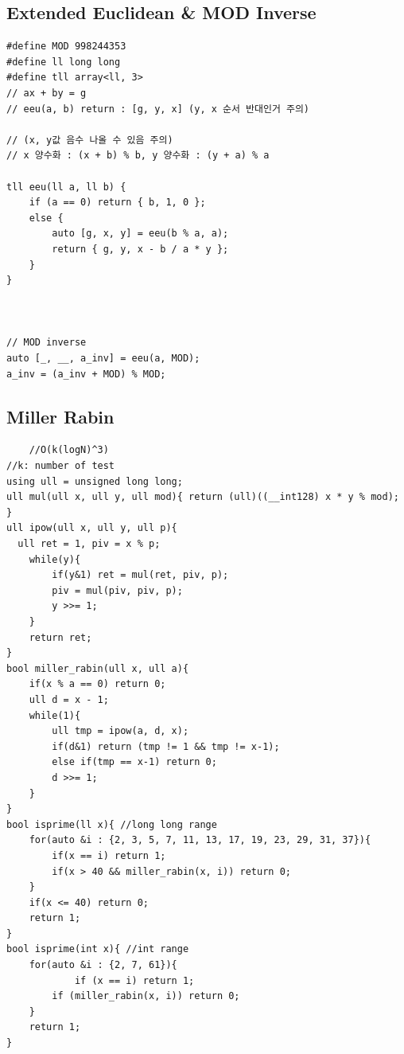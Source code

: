 \documentclass[landscape, 8pt, a4paper, oneside, twocolumn]{extarticle}
\begin{document}
\subsection{Extended Euclidean \& MOD Inverse}
\begin{verbatim}
#define MOD 998244353
#define ll long long
#define tll array<ll, 3>
// ax + by = g
// eeu(a, b) return : [g, y, x] (y, x 순서 반대인거 주의)

// (x, y값 음수 나올 수 있음 주의)
// x 양수화 : (x + b) % b, y 양수화 : (y + a) % a

tll eeu(ll a, ll b) { 
    if (a == 0) return { b, 1, 0 };
    else {
        auto [g, x, y] = eeu(b % a, a);
        return { g, y, x - b / a * y };
    }
}



// MOD inverse 
auto [_, __, a_inv] = eeu(a, MOD);
a_inv = (a_inv + MOD) % MOD;
\end{verbatim}
\subsection{Miller Rabin}
\begin{verbatim}
    //O(k(logN)^3)
//k: number of test
using ull = unsigned long long;
ull mul(ull x, ull y, ull mod){ return (ull)((__int128) x * y % mod); }
ull ipow(ull x, ull y, ull p){
  ull ret = 1, piv = x % p;
    while(y){
        if(y&1) ret = mul(ret, piv, p);
        piv = mul(piv, piv, p);
        y >>= 1;
    }
    return ret;
}
bool miller_rabin(ull x, ull a){
    if(x % a == 0) return 0;
    ull d = x - 1;
    while(1){
        ull tmp = ipow(a, d, x);
        if(d&1) return (tmp != 1 && tmp != x-1);
        else if(tmp == x-1) return 0;
        d >>= 1;
    }
}
bool isprime(ll x){ //long long range
    for(auto &i : {2, 3, 5, 7, 11, 13, 17, 19, 23, 29, 31, 37}){
        if(x == i) return 1;
        if(x > 40 && miller_rabin(x, i)) return 0;
    }
    if(x <= 40) return 0;
    return 1;
}
bool isprime(int x){ //int range
    for(auto &i : {2, 7, 61}){
            if (x == i) return 1;
        if (miller_rabin(x, i)) return 0;
    }
    return 1;
}
\end{verbatim}
\end{document}
